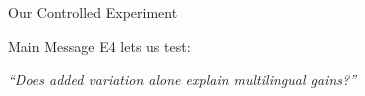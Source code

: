 \documentclass[aspectratio=169]{beamer}
\begin{document}
\begin{frame}{Our Controlled Experiment}

\vspace{0.45cm}

\begin{alertblock}{Main Message}
E4 lets us test:

\vspace{0.1cm}

\centering
\textit{``Does added variation alone explain multilingual gains?''}
\end{alertblock}

\end{frame}


\end{document}
